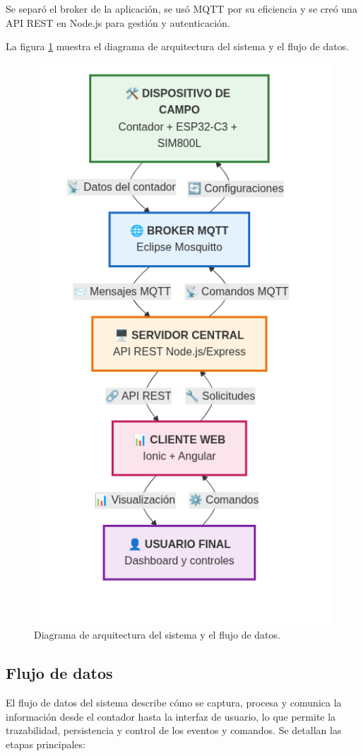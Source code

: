 Se separó el broker de la aplicación, se usó MQTT por su eficiencia y se creó una API REST en Node.js para gestión y autenticación.

La figura \ref{fig:diag_arquitectura} muestra el diagrama de arquitectura del sistema y el flujo de datos.


\begin{figure}[H]
  \centering
  \includegraphics[width=0.45\linewidth]{./Figures/diagArq.png}
  \caption{Diagrama de arquitectura del sistema y el flujo de datos.}
  \label{fig:diag_arquitectura}
\end{figure}



\subsection{Flujo de datos} 
El flujo de datos del sistema describe cómo se captura, procesa y comunica la información desde el contador hasta la interfaz de usuario, lo que permite la trazabilidad, persistencia y control de los eventos y comandos. Se detallan las etapas principales:

